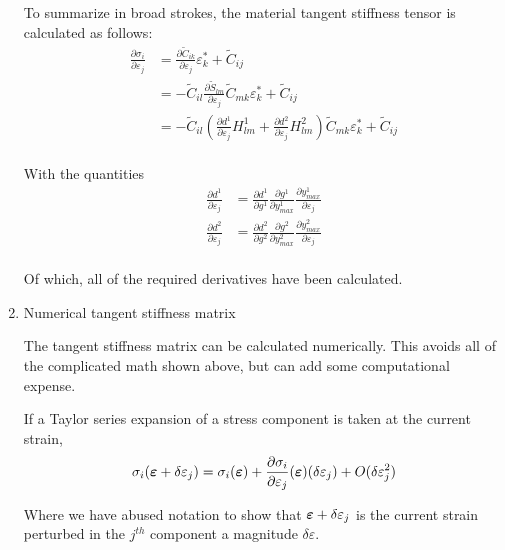 \documentclass[11pt]{article}
\begin{document}
\begin{enumerate}
To summarize in broad strokes, the material tangent stiffness tensor
is calculated as follows:
\begin{equation*}
  \begin{split}
    \frac{\partial \sigma_i}{\partial \varepsilon_j} &=
    \frac{\partial \tilde{C}_{ik}}{\partial \varepsilon_j} \varepsilon_k^{*} + \tilde{C}_{ij} \\
     &= -\tilde{C}_{il} \frac{\partial \tilde{S}_{lm}}{\partial \varepsilon_j} \tilde{C}_{mk} \varepsilon_k^* + \tilde{C}_{ij} \\
     &= -\tilde{C}_{il} (\frac{\partial d^1}{\partial \varepsilon_j} H_{lm}^1 + \frac{\partial d^2}{\partial \varepsilon_j} H_{lm}^2)
    \tilde{C}_{mk} \varepsilon_k^* + \tilde{C}_{ij} \\
  \end{split}
\end{equation*}

With the quantities
\begin{equation*}
  \begin{split}
    \frac{\partial d^1}{\partial \varepsilon_j} &=
    \frac{\partial d^1}{\partial g^1} \frac{\partial g^1}{\partial y_{max}^1} \frac{\partial y_{max}^1}{\partial \varepsilon_j} \\
    \frac{\partial d^2}{\partial \varepsilon_j} &=
    \frac{\partial d^2}{\partial g^2} \frac{\partial g^2}{\partial y_{max}^2} \frac{\partial y_{max}^2}{\partial \varepsilon_j} \\
  \end{split}
\end{equation*}

Of which, all of the required derivatives have been calculated.

\item Numerical tangent stiffness matrix
\label{sec:org9cf3c37}

The tangent stiffness matrix can be calculated numerically. This
avoids all of the complicated math shown above, but can add some
computational expense.

If a Taylor series expansion of a stress component is taken at the
current strain,
\[
\sigma_i (\bm{\varepsilon} + \delta \varepsilon_j) = \sigma_i (\bm{\varepsilon}) +
\frac{\partial \sigma_i}{\partial \varepsilon_j} (\bm{\varepsilon}) (\delta \varepsilon_j) + O(\delta \varepsilon_j^2)
\]

Where we have abused notation to show that
\(\bm{\varepsilon} + \delta \varepsilon_j\) is the current strain perturbed in
the \(j^{th}\) component a magnitude \(\delta \varepsilon\).


\end{enumerate}
\end{document}
